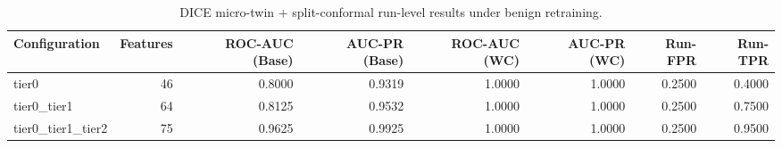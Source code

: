 \begin{table}[t]
\centering
\caption{DICE micro-twin + split-conformal run-level results under benign retraining.}
\label{tab:dice_full_overall}
\footnotesize
\begin{tabular}{lrrrrrrr}
\toprule
Configuration & Features & ROC-AUC (Base) & AUC-PR (Base) & ROC-AUC (WC) & AUC-PR (WC) & Run-FPR & Run-TPR \\
\midrule
tier0 & 46 & 0.8000 & 0.9319 & 1.0000 & 1.0000 & 0.2500 & 0.4000 \\
tier0_tier1 & 64 & 0.8125 & 0.9532 & 1.0000 & 1.0000 & 0.2500 & 0.7500 \\
tier0_tier1_tier2 & 75 & 0.9625 & 0.9925 & 1.0000 & 1.0000 & 0.2500 & 0.9500 \\
\bottomrule
\end{tabular}

\end{table}
